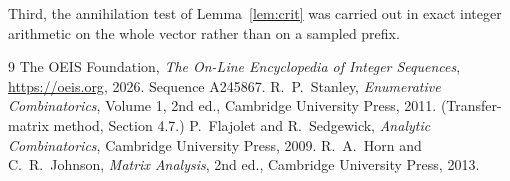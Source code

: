 \documentclass[11pt,a4paper]{article}
\theoremstyle{plain}
\theoremstyle{definition}
\begin{document}
Third, the annihilation test of Lemma~\ref{lem:crit} was carried out in exact integer
arithmetic on the whole vector rather than on a sampled prefix.

\begin{thebibliography}{9}
 The OEIS Foundation, \emph{The On-Line Encyclopedia of Integer
Sequences}, \url{https://oeis.org}, 2026. Sequence A245867.
 R.~P.~Stanley, \emph{Enumerative Combinatorics}, Volume 1, 2nd ed.,
Cambridge University Press, 2011. (Transfer-matrix method, Section 4.7.)
 P.~Flajolet and R.~Sedgewick, \emph{Analytic Combinatorics}, Cambridge
University Press, 2009.
 R.~A.~Horn and C.~R.~Johnson, \emph{Matrix Analysis}, 2nd ed., Cambridge
University Press, 2013.
\end{thebibliography}
\end{document}
